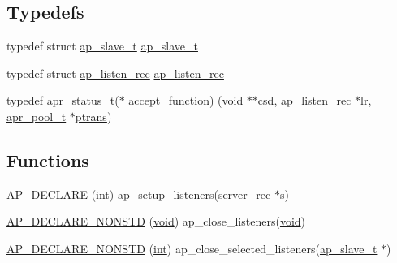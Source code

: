 \subsection*{Typedefs}
\begin{DoxyCompactItemize}
\item 
typedef struct \hyperlink{group__APACHE__CORE__LISTEN_ga04ffa2cefc7cae1fca59d225f4c7e78e}{ap\+\_\+slave\+\_\+t} \hyperlink{group__APACHE__CORE__LISTEN_ga04ffa2cefc7cae1fca59d225f4c7e78e}{ap\+\_\+slave\+\_\+t}
\item 
typedef struct \hyperlink{structap__listen__rec}{ap\+\_\+listen\+\_\+rec} \hyperlink{group__APACHE__CORE__LISTEN_ga44c4f5e42b1dee23847d1e8b94b60869}{ap\+\_\+listen\+\_\+rec}
\item 
typedef \hyperlink{group__apr__errno_gaa5105fa83cc322f09382292db8b47593}{apr\+\_\+status\+\_\+t}($\ast$ \hyperlink{group__APACHE__CORE__LISTEN_gabf51c6b338f9923aec6586c1d5be7e59}{accept\+\_\+function}) (\hyperlink{group__MOD__ISAPI_gacd6cdbf73df3d9eed42fa493d9b621a6}{void} $\ast$$\ast$\hyperlink{group__APACHE__CORE__CONNECTION_ga37491385bd0907d7a64ed8a3ec309aaa}{csd}, \hyperlink{structap__listen__rec}{ap\+\_\+listen\+\_\+rec} $\ast$\hyperlink{group__APACHE__OS__UNIX_gad86a53a31ae797d73195f2f01d5e84bd}{lr}, \hyperlink{structapr__pool__t}{apr\+\_\+pool\+\_\+t} $\ast$\hyperlink{group__APACHE__OS__UNIX_gad4c037f30d9f5c212a5cb6116556aae5}{ptrans})
\end{DoxyCompactItemize}
\subsection*{Functions}
\begin{DoxyCompactItemize}
\item 
\hyperlink{group__APACHE__CORE__LISTEN_ga094e7279870a8dd19c0db7b31e0a2c3a}{A\+P\+\_\+\+D\+E\+C\+L\+A\+RE} (\hyperlink{pcre_8txt_a42dfa4ff673c82d8efe7144098fbc198}{int}) ap\+\_\+setup\+\_\+listeners(\hyperlink{structserver__rec}{server\+\_\+rec} $\ast$\hyperlink{pcretest_8txt_a062597889ba244b72877454b1d3adecf}{s})
\item 
\hyperlink{group__APACHE__CORE__LISTEN_ga41a09cbeeecb4898dbae176a6e720c68}{A\+P\+\_\+\+D\+E\+C\+L\+A\+R\+E\+\_\+\+N\+O\+N\+S\+TD} (\hyperlink{group__MOD__ISAPI_gacd6cdbf73df3d9eed42fa493d9b621a6}{void}) ap\+\_\+close\+\_\+listeners(\hyperlink{group__MOD__ISAPI_gacd6cdbf73df3d9eed42fa493d9b621a6}{void})
\item 
\hyperlink{group__APACHE__CORE__LISTEN_gacafd76b087cb7f4fe8ac5f40ab7d56ec}{A\+P\+\_\+\+D\+E\+C\+L\+A\+R\+E\+\_\+\+N\+O\+N\+S\+TD} (\hyperlink{pcre_8txt_a42dfa4ff673c82d8efe7144098fbc198}{int}) ap\+\_\+close\+\_\+selected\+\_\+listeners(\hyperlink{group__APACHE__CORE__LISTEN_ga04ffa2cefc7cae1fca59d225f4c7e78e}{ap\+\_\+slave\+\_\+t} $\ast$)
\end{DoxyCompactItemize}
